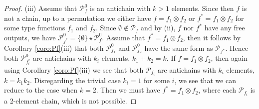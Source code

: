 \documentclass[12pt]{article}
\theoremstyle{definition}
\theoremstyle{remark}
\def\Pe{\mathcal P}
\begin{document}
\begin{proof}
(iii) Assume that $\Pe_f^0$ is an antichain with $k>1$ elements. Since then $f$ is
not a chain, up to a permutation we either have $f=f_1\otimes f_2$ or $f^*=f_1\otimes f_2$
for some type functions $f_1$ and $f_2$. Since $\emptyset \notin \Pe_f$ and by (ii), $f$
nor $f^*$ have any free outputs, we have $\Pe_{f^*}^0=\{\emptyset\}\star \Pe_f^0$. 
Assume that $f^*=f_1\otimes f_2$, then it follows by Corollary \ref{coro:Pf}(iii)
that both $\Pe_{f_1}^0$ and $\Pe_{f_2}^0$ have the same form as $\Pe_{f^*}$.
Hence both $\Pe_{f^*_i}^0$ are antichains with $k_i$ elements, $k_1+k_2=k$.
If $f=f_1\otimes f_2$, then again using Corollary \ref{coro:Pf}(iii) we see that 
both $\Pe_{f_i}$ are antichains with $k_i$ elements, $k=k_1k_2$. Disregarding the trivial
case $k_i=1$ for some $i$, we see that we can reduce to the case when $k=2$. Then we must
have $f^*=f_1\otimes f_2$, where each $\Pe_{f_i}$ is a 2-element chain, which is not
possible.




\end{proof}
\end{document}

